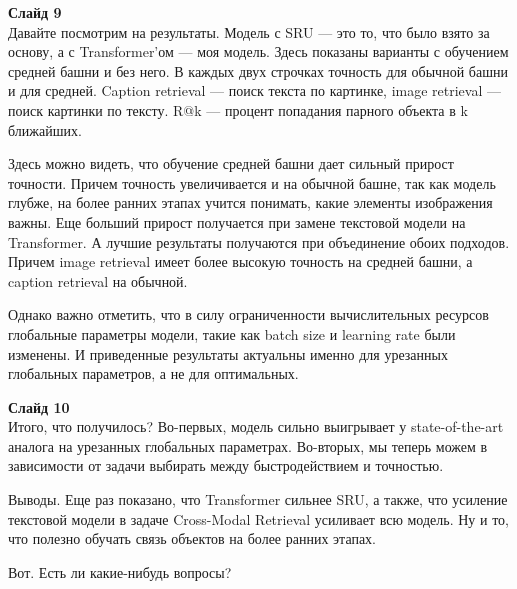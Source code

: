 \documentclass[12pt]{article}
\begin{document}
	\textbf{Слайд 9}\\
	Давайте посмотрим на результаты. Модель с SRU --- это то, что было взято за основу, а с Transformer'ом --- моя модель. Здесь показаны варианты с обучением средней башни и без него. В каждых двух строчках точность для обычной башни и для средней. Caption retrieval --- поиск текста по картинке, image retrieval --- поиск картинки по тексту. R@k --- процент попадания парного объекта в k ближайших.
	
	Здесь можно видеть, что обучение средней башни дает сильный прирост точности. Причем точность увеличивается и на обычной башне, так как модель глубже, на более ранних этапах учится понимать, какие элементы изображения важны. Еще больший прирост получается при замене текстовой модели на Transformer. А лучшие результаты получаются при объединение обоих подходов. Причем image retrieval имеет более высокую точность на средней башни, а caption retrieval на обычной.
	
	Однако важно отметить, что в силу ограниченности вычислительных ресурсов глобальные параметры модели, такие как batch size и learning rate были изменены. И приведенные результаты актуальны именно для урезанных глобальных параметров, а не для оптимальных.
	
	\textbf{Слайд 10}\\
	Итого, что получилось? Во-первых, модель сильно выигрывает у state-of-the-art аналога на урезанных глобальных параметрах. Во-вторых, мы теперь можем в зависимости от задачи выбирать между быстродействием и точностью.
	
	Выводы. Еще раз показано, что Transformer сильнее SRU, а также, что усиление текстовой модели в задаче Cross-Modal Retrieval усиливает всю модель. Ну и то, что полезно обучать связь объектов на более ранних этапах.
	
	Вот. Есть ли какие-нибудь вопросы?
	
\end{document}
